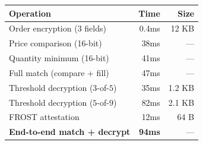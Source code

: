 \begin{center}
\begin{tabular}{lrr}
\toprule
\textbf{Operation} & \textbf{Time} & \textbf{Size} \\
\midrule
Order encryption (3 fields) & 0.4ms & 12 KB \\
Price comparison (16-bit) & 38ms & --- \\
Quantity minimum (16-bit) & 41ms & --- \\
Full match (compare + fill) & 47ms & --- \\
Threshold decryption ($3$-of-$5$) & 35ms & 1.2 KB \\
Threshold decryption ($5$-of-$9$) & 82ms & 2.1 KB \\
FROST attestation & 12ms & 64 B \\
\midrule
\textbf{End-to-end match + decrypt} & \textbf{94ms} & --- \\
\bottomrule
\end{tabular}
\end{center}


